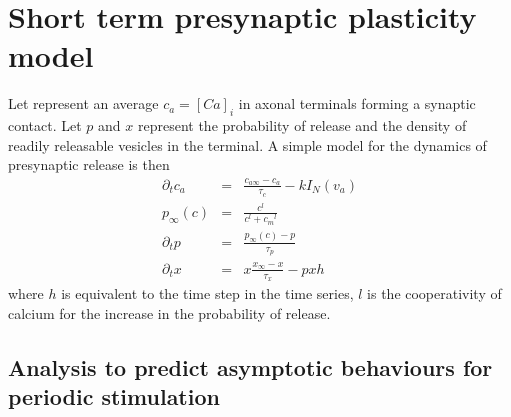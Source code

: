 \documentclass[10pt]{article}
\begin{document}
\section{Short term presynaptic plasticity model}
Let represent an average $c_a = [Ca]_{i}$ in axonal terminals forming a synaptic contact. Let $p$ and $x$ represent the probability of release and the density of readily releasable vesicles in the terminal. A simple model for the dynamics of presynaptic release 
is then
\begin{eqnarray}
\partial_t c_a &=& \frac{c_{a\infty}-c_a}{\tau_c} - k I_N(v_{a})
\label{}
\\
p_{\infty}(c) &=& \frac{c^l}{c^l + {c_m}^l} 
\\
\partial_t p &=&  \frac{p_{\infty}(c)-p}{\tau_p} 
\\
\partial_t x &=& x \frac{x_{\infty}-x}{\tau_x} - p x h
\end{eqnarray}
where $h$ is equivalent to the time step in the time series, $l$ is the cooperativity of calcium for the increase in the probability of release.

\subsection{Analysis to predict asymptotic behaviours for periodic stimulation}
\end{document}
